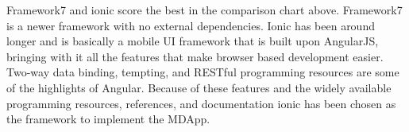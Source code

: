 Framework7 and ionic score the best in the comparison chart above. Framework7 is a newer framework with no external dependencies. Ionic has been around longer and is basically a mobile UI framework that is built upon AngularJS, bringing with it all the features that make browser based development easier. Two-way data binding, tempting, and RESTful programming resources are some of the highlights of Angular. Because of these features and the widely available programming resources, references, and documentation ionic has been chosen as the framework to implement the MDApp.

